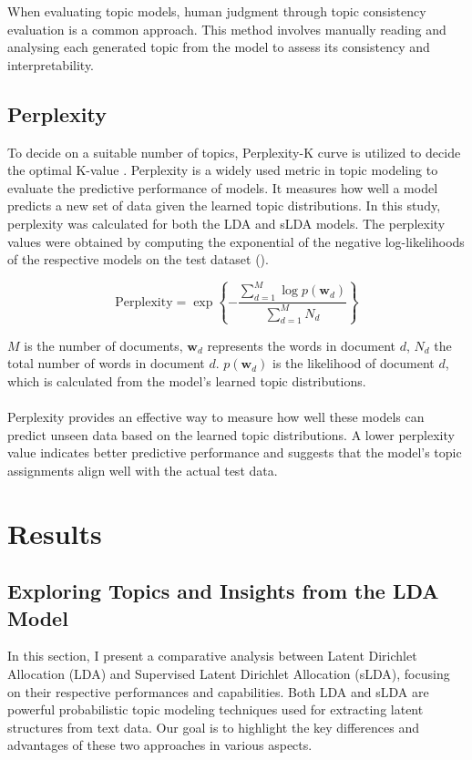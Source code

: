 \documentclass[12pt,twoside]{article}
\begin{document}
When evaluating topic models, human judgment through topic consistency evaluation is a common approach. This method involves manually reading and analysing each generated topic from the model to assess its consistency and interpretability.

\subsection{Perplexity}

To decide on a suitable number of topics, Perplexity-K curve is utilized to decide the optimal K-value \cite{Huang2017}. Perplexity is a widely used metric in topic modeling to evaluate the predictive performance of models. It measures how well a model predicts a new set of data given the learned topic distributions. In this study, perplexity was calculated for both the LDA and sLDA models. The perplexity values were obtained by computing the exponential of the negative log-likelihoods of the respective models on the test dataset (\cite{wallach2009evaluation}).

\begin{equation}
        \text{Perplexity} = \exp \left\{ -\frac{{\sum_{d=1}^{M} \log p(\mathbf{w}_d)}}{{\sum_{d=1}^{M} N_d}} \right\}
\end{equation}


\(M\) is the number of documents, \(\mathbf{w}_d\) represents the words in document \(d\), \(N_d\) the total number of words in document \(d\). \(p(\mathbf{w}_d)\) is the likelihood of document 
\(d\), which is calculated from the model's learned topic distributions.\\\\

Perplexity provides an effective way to measure how well these models can predict unseen data based on the learned topic distributions. A lower perplexity value indicates better predictive performance and suggests that the model's topic assignments align well with the actual test data.



\section{Results}
\subsection{Exploring Topics and Insights from the LDA Model}
In this section, I present a comparative analysis between Latent Dirichlet Allocation (LDA) and Supervised Latent Dirichlet Allocation (sLDA), focusing on their respective performances and capabilities. Both LDA and sLDA are powerful probabilistic topic modeling techniques used for extracting latent structures from text data. Our goal is to highlight the key differences and advantages of these two approaches in various aspects.\\\\
\end{document}
